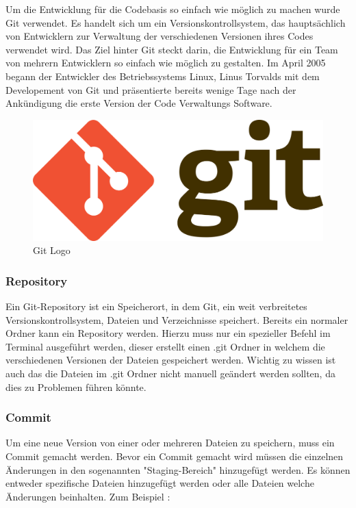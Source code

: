 Um die Entwicklung für die Codebasis so einfach wie möglich zu machen wurde Git verwendet. Es handelt sich um ein Versionskontrollsystem, das hauptsächlich von Entwicklern zur Verwaltung der verschiedenen Versionen ihres Codes verwendet wird. Das Ziel hinter Git steckt darin, die Entwicklung für ein Team von mehrern Entwicklern so einfach wie möglich zu gestalten. Im April 2005 begann der Entwickler des Betriebssystems Linux, Linus Torvalds mit dem Developement von Git und präsentierte bereits wenige Tage nach der Ankündigung die erste Version der Code Verwaltungs Software.

\begin{figure}[h!]
    \centering
    \includegraphics[width=0.5\linewidth]{pics/git-logo.png}
    \caption{Git Logo}
    \label{fig:enter-label}
\end{figure}

\cite{Git}

\subsubsection{Repository}

Ein Git-Repository ist ein Speicherort, in dem Git, ein weit verbreitetes Versionskontrollsystem, Dateien und Verzeichnisse speichert. Bereits ein normaler Ordner kann ein Repository werden. Hierzu muss nur ein spezieller Befehl im Terminal ausgeführt werden, dieser erstellt einen .git Ordner in welchem die verschiedenen Versionen der Dateien gespeichert werden. Wichtig zu wissen ist auch das die Dateien im .git Ordner nicht manuell geändert werden sollten, da dies zu Problemen führen könnte.

\subsubsection{Commit}

Um eine neue Version von einer oder mehreren Dateien zu speichern, muss ein Commit gemacht werden. Bevor ein Commit gemacht wird müssen die einzelnen Änderungen in den sogenannten "Staging-Bereich" hinzugefügt werden. Es können entweder spezifische Dateien hinzugefügt werden oder alle Dateien welche Änderungen beinhalten. Zum Beispiel :

